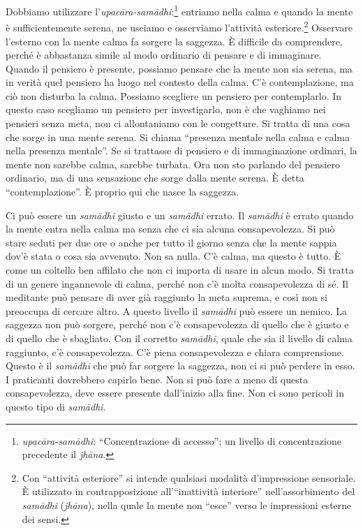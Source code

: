 Dobbiamo utilizzare l'\emph{upacāra-samādhi}:\footnote{\emph{upacāra-samādhi}:
  ``Concentrazione di accesso''; un livello di concentrazione precedente
  il \emph{jhāna}.} entriamo nella calma e quando la mente è
sufficientemente serena, ne usciamo e osserviamo l'attività
esteriore.\footnote{Con ``attività esteriore'' si intende qualsiasi
  modalità d'impressione sensoriale. È utilizzato in contrapposizione
  all'``inattività interiore'' nell'assorbimento del \emph{samādhi}
  (\emph{jhāna}), nella quale la mente non ``esce'' verso le impressioni
  esterne dei sensi.} Osservare l'esterno con la mente calma fa sorgere
la saggezza. È difficile da comprendere, perché è abbastanza simile al
modo ordinario di pensare e di immaginare. Quando il pensiero è
presente, possiamo pensare che la mente non sia serena, ma in verità
quel pensiero ha luogo nel contesto della calma. C'è contemplazione, ma
ciò non disturba la calma. Possiamo scegliere un pensiero per
contemplarlo. In questo caso scegliamo un pensiero per investigarlo, non
è che vaghiamo nei pensieri senza meta, non ci allontaniamo con le
congetture. Si tratta di una cosa che sorge in una mente serena. Si
chiama ``presenza mentale nella calma e calma nella presenza mentale''.
Se si trattasse di pensiero e di immaginazione ordinari, la mente non
sarebbe calma, sarebbe turbata. Ora non sto parlando del pensiero
ordinario, ma di una sensazione che sorge dalla mente serena. È detta
``contemplazione''. È proprio qui che nasce la saggezza.

Ci può essere un \emph{samādhi} giusto e un \emph{samādhi} errato. Il
\emph{samādhi} è errato quando la mente entra nella calma ma senza che
ci sia alcuna consapevolezza. Si può stare seduti per due ore o anche
per tutto il giorno senza che la mente sappia dov'è stata o cosa sia
avvenuto. Non sa nulla. C'è calma, ma questo è tutto. È come un coltello
ben affilato che non ci importa di usare in alcun modo. Si tratta di un
genere ingannevole di calma, perché non c'è molta consapevolezza di sé.
Il meditante può pensare di aver già raggiunto la meta suprema, e così
non si preoccupa di cercare altro. A questo livello il \emph{samādhi}
può essere un nemico. La saggezza non può sorgere, perché non c'è
consapevolezza di quello che è giusto e di quello che è sbagliato. Con
il corretto \emph{samādhi}, quale che sia il livello di calma raggiunto,
c'è consapevolezza. C'è piena consapevolezza e chiara comprensione.
Questo è il \emph{samādhi} che può far sorgere la saggezza, non ci si
può perdere in esso. I praticanti dovrebbero capirlo bene. Non si può
fare a meno di questa consapevolezza, deve essere presente dall'inizio
alla fine. Non ci sono pericoli in questo tipo di \emph{samādhi}.

